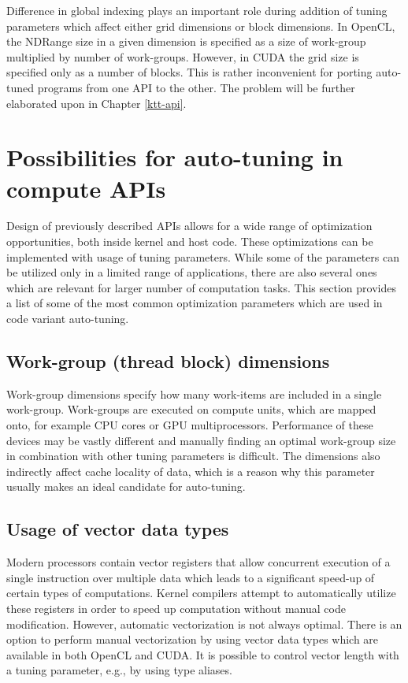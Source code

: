\documentclass
[
    digital, %
    oneside, %
    table, %
    nolof, %
    nolot, %
    nocover %
]{fithesis3}
\begin{document}
Difference in global indexing plays an important role during addition of tuning parameters which affect either grid dimensions or block dimensions.
In OpenCL, the NDRange size in a given dimension is specified as a size of work-group multiplied by number of work-groups. However, in CUDA the grid
size is specified only as a number of blocks. This is rather inconvenient for porting auto-tuned programs from one API to the other. The problem
will be further elaborated upon in Chapter \ref{ktt-api}.

\section{Possibilities for auto-tuning in compute APIs}
Design of previously described APIs allows for a wide range of optimization opportunities, both inside kernel and host code. These optimizations can
be implemented with usage of tuning parameters. While some of the parameters can be utilized only in a limited range of applications, there are also
several ones which are relevant for larger number of computation tasks. This section provides a list of some of the most common optimization parameters
which are used in code variant auto-tuning.

\subsection{Work-group (thread block) dimensions}
Work-group dimensions specify how many work-items are included in a single work-group. Work-groups are executed on compute units, which are mapped
onto, for example CPU cores or GPU multiprocessors. Performance of these devices may be vastly different and manually finding an optimal work-group
size in combination with other tuning parameters is difficult. The dimensions also indirectly affect cache locality of data, which is a reason why
this parameter usually makes an ideal candidate for auto-tuning.

\subsection{Usage of vector data types}
Modern processors contain vector registers that allow concurrent execution of a single instruction over multiple data which leads to a significant
speed-up of certain types of computations. Kernel compilers attempt to automatically utilize these registers in order to speed up computation without
manual code modification. However, automatic vectorization is not always optimal. There is an option to perform manual vectorization by using vector
data types which are available in both OpenCL and CUDA. It is possible to control vector length with a tuning parameter, e.g., by using type aliases.
\end{document}
